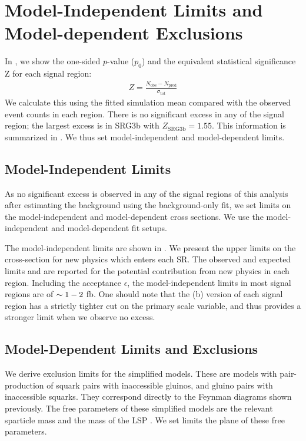 \section{Model-Independent Limits and Model-dependent Exclusions}

In , we show the one-sided $p$-value ($p_0$) and the equivalent statistical significance Z for each signal region:
\begin{align}
Z = \frac{N_{\mathrm{obs}} - N_{\mathrm{pred}}}{\sigma_{\mathrm{tot}}}
\end{align}
We calculate this using the fitted simulation mean compared with the observed event counts in each region.
There is no significant excess in any of the signal region; the largest excess is in SRG3b with $Z_{\text{SRG3b}} = 1.55$.
This information is summarized in .
We thus set model-independent and model-dependent limits.

\subsection{Model-Independent Limits}

As no significant excess is observed in any of the signal regions of this analysis after estimating the background using the background-only fit, we set limits on the model-independent and model-dependent cross sections.
We use the model-independent and model-dependent fit setups.

The model-independent limits are shown in .
We present the upper limits on the cross-section for new physics which enters each SR.
The observed and expected limits \sobs and \sexp are reported for the potential contribution from new physics in each region.
Including the acceptance $\epsilon$, the model-independent limits in most signal regions are of $\sim 1-2$ fb.
One should note that the (b) version of each signal region has a strictly tighter cut on the primary scale variable, and thus provides a stronger limit when we observe no excess.

\subsection{Model-Dependent Limits and Exclusions}

We derive exclusion limits for the simplified models.
These are models with pair-production of squark pairs with inaccessible gluinos, and gluino pairs with inaccessible squarks.
They correspond directly to the Feynman diagrams shown previously.
The free parameters of these simplified models are the relevant sparticle mass and the mass of the LSP \lsp.
We set limits the plane of these free parameters.

